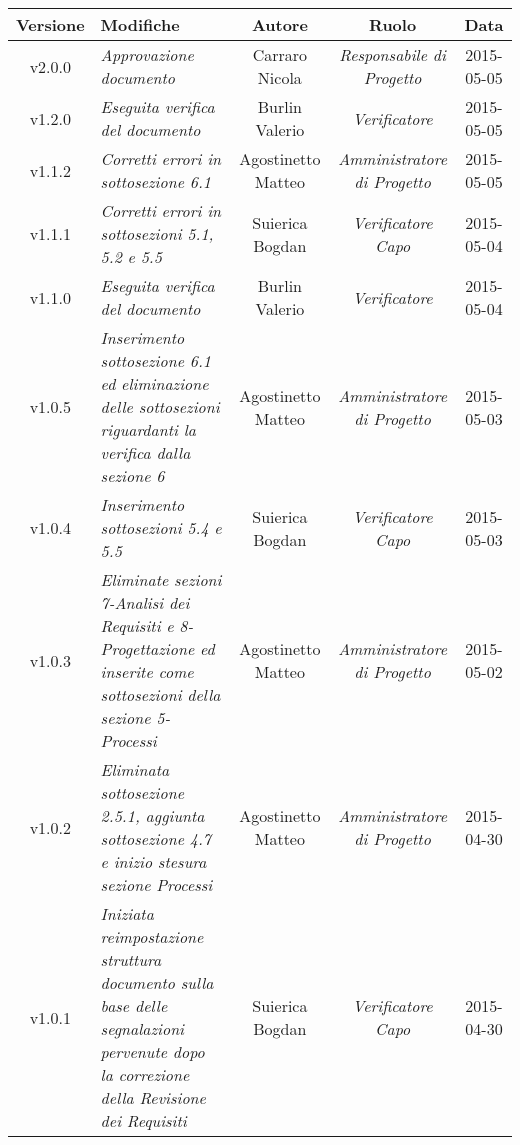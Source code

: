 \newpage
\begin{table}[h]
\centering
\begin{tabular}{|c|p{}|c|c|c|}
	\toprule
	\textbf{Versione} & \textbf{Modifiche} & \textbf{Autore} & \textbf{Ruolo} & \textbf{Data} \\
	\midrule
	\midrule
		v2.0.0 & \textit{Approvazione documento} & Carraro Nicola & \textit{Responsabile di Progetto} & 2015-05-05\\
	\midrule
		v1.2.0 & \textit{Eseguita verifica del documento} & Burlin Valerio & \textit{Verificatore} & 2015-05-05\\
	\midrule
		v1.1.2 & \textit{Corretti errori in sottosezione 6.1} & Agostinetto Matteo & \textit{Amministratore di Progetto} & 2015-05-05\\
	\midrule
		v1.1.1 & \textit{Corretti errori in sottosezioni 5.1, 5.2 e 5.5} & Suierica Bogdan & \textit{Verificatore Capo} & 2015-05-04\\
	\midrule
		v1.1.0 & \textit{Eseguita verifica del documento} & Burlin Valerio & \textit{Verificatore} & 2015-05-04\\
	\midrule
		v1.0.5 & \textit{Inserimento sottosezione 6.1 ed eliminazione delle sottosezioni riguardanti la verifica dalla sezione 6} & Agostinetto Matteo & \textit{Amministratore di Progetto} & 2015-05-03\\
	\midrule
		v1.0.4 & \textit{Inserimento sottosezioni 5.4 e 5.5} & Suierica Bogdan & \textit{Verificatore Capo} & 2015-05-03\\
	\midrule
		v1.0.3 & \textit{Eliminate sezioni 7-Analisi dei Requisiti e 8-Progettazione ed inserite come sottosezioni della sezione 5-Processi} & Agostinetto Matteo & \textit{Amministratore di Progetto} & 2015-05-02\\
	\midrule
		v1.0.2 & \textit{Eliminata sottosezione 2.5.1, aggiunta sottosezione 4.7 e inizio stesura sezione Processi} & Agostinetto Matteo & \textit{Amministratore di Progetto} & 2015-04-30\\
	\midrule
		v1.0.1 & \textit{Iniziata reimpostazione struttura documento sulla base delle segnalazioni pervenute dopo la correzione della Revisione dei Requisiti} & Suierica Bogdan & \textit{Verificatore Capo} & 2015-04-30\\
	\bottomrule
\end{tabular}
\end{table}
\newpage
